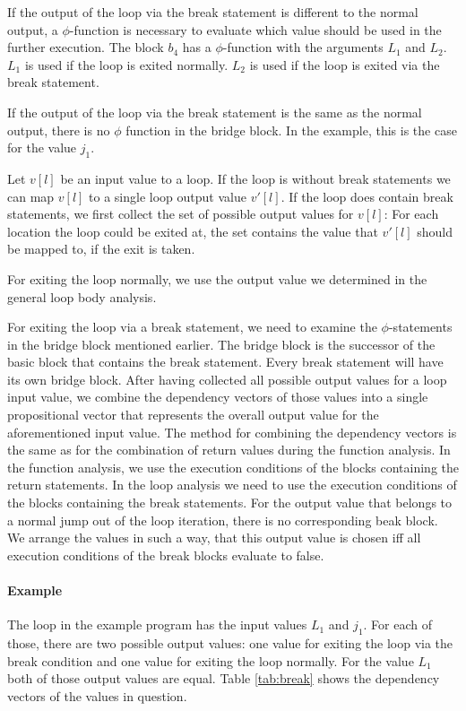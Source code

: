 If the output of the loop via the break statement is different to the normal output, a $\phi$-function is necessary to evaluate which value should be used in the further execution. The block $b_4$ has a $\phi$-function with the arguments $L_1$ and $L_2$. $L_1$ is used if the loop is exited normally. $L_2$ is used if the loop is exited via the break statement. 

If the output of the loop via the break statement is the same as the normal output, there is no $\phi$ function in the bridge block. In the example, this is the case for the value $j_1$.

Let $v[l]$ be an input value to a loop. If the loop is without break statements we can map $v[l]$ to a single loop output value $v'[l]$. If the loop does contain break statements, we first collect the set of possible output values for $v[l]$: For each location the loop could be exited at, the set contains the value that $v'[l]$ should be mapped to, if the exit is taken.

For exiting the loop normally, we use the output value we determined in the general loop body analysis.

For exiting the loop via a break statement, we need to examine the $\phi$-statements in the bridge block mentioned earlier. The bridge block is the successor of the basic block that contains the break statement. Every break statement will have its own bridge block. 
After having collected all possible output values for a loop input value, we combine the dependency vectors of those values into a single propositional vector that represents the overall output value for the aforementioned input value. The method for combining the dependency vectors is the same as for the combination of return values during the function analysis. In the function analysis, we use the execution conditions of the blocks containing the return statements. In the loop analysis we need to use the execution conditions of the blocks containing the break statements. For the output value that belongs to a normal jump out of the loop iteration, there is no corresponding beak block. We arrange the values in such a way, that this output value is chosen iff all execution conditions of the break blocks evaluate to false.

\paragraph{Example}
The loop in the example program has the input values $L_1$ and $j_1$. For each of those, there are two possible output values: one value for exiting the loop via the break condition and one value for exiting the loop normally. For the value $L_1$ both of those output values are equal. Table \ref{tab:break} shows the dependency vectors of the values in question.

